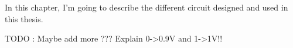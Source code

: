 
\label{cap:design}

In this chapter, I'm going to describe the different circuit designed and used in this thesis.

TODO : Maybe add more ???
Explain 0->0.9V and 1->1V!!




\cleardoublepage
